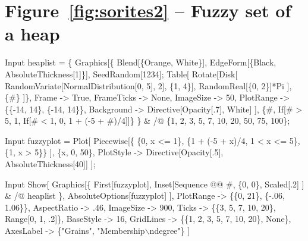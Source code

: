 \documentclass[11pt,fleqn]{book} %
\begin{document}
\section*{Figure~\ref{fig:sorites2} -- Fuzzy set of a heap }
\small{
\begin{mmaCell}[index=1]{Input}
  heaplist = \{
    Graphics[\{
      Blend[\{Orange, White\}], 
      EdgeForm[\{Black, AbsoluteThickness[1]\}], 
      SeedRandom[1234]; 
      Table[
        Rotate[Disk[
          RandomVariate[NormalDistribution[0, 5], 2], \{1, 4\}], 
          RandomReal[\{0, 2\}]*Pi
        ], 
        \{#\}
      ]\}, 
      Frame      -> True, 
      FrameTicks -> None,
      ImageSize  -> 50, 
      PlotRange  -> \{\{-14, 14\}, \{-14, 14\}\}, 
      Background -> Directive[Opacity[.7], White]
    ], 
    \{#, If[# > 5, 1, If[# < 1, 0, 1 + (-5 + #)/4]]\}
  \} & /@ \{1, 2, 3, 5, 7, 10, 20, 50, 75, 100\};
\end{mmaCell}

\begin{mmaCell}{Input}
  fuzzyplot = 
    Plot[
      Piecewise[\{
        \{0, x <= 1\}, 
        \{1 + (-5 + x)/4, 1 < x <= 5\}, 
        \{1, x > 5\}\}
      ],
      \{x, 0, 50\}, 
      PlotStyle -> Directive[Opacity[.5], AbsoluteThickness[40]]
    ];
\end{mmaCell}

\begin{mmaCell}{Input}
  Show[
    Graphics[\{
      First[fuzzyplot], 
      Inset[Sequence @@ #, \{0, 0\}, Scaled[.2]
      ] & /@ heaplist \}, 
      AbsoluteOptions[fuzzyplot]
    ],
    PlotRange   -> \{\{0, 21\}, \{-.06, 1.06\}\}, 
    AspectRatio -> .46, 
    ImageSize   -> 900, 
    Ticks       -> \{\{3, 5, 7, 10, 20\}, Range[0, 1, .2]\},
    BaseStyle   -> 16, 
    GridLines   -> \{\{1, 2, 3, 5, 7, 10, 20\}, None\}, 
    AxesLabel   -> \{"Grains", "Membership\(\backslash\)ndegree"\}
  ]
\end{mmaCell}
}


\end{document}

